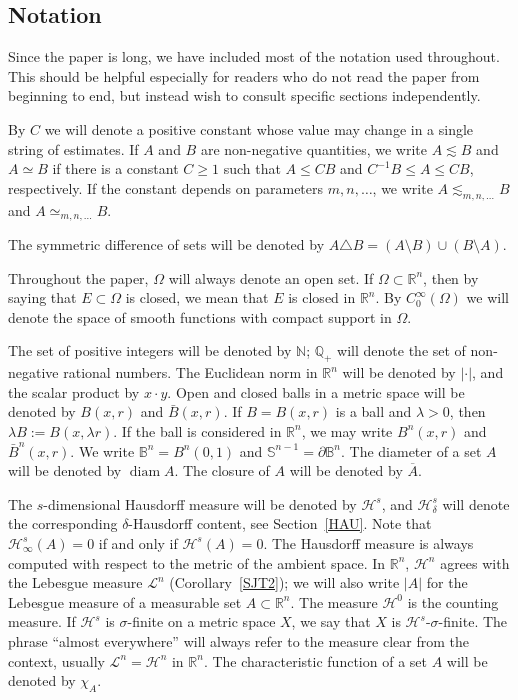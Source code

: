 \documentclass[12pt,leqno]{amsart}
\theoremstyle{definition}
\newcommand{\bbbr}{\mathbb R}
\newcommand{\bbbb}{\mathbb B}
\newcommand{\qp}{{\mathbb Q}_+}
\newcommand{\Sph}{\mathbb S}
\def\H{{\mathcal H}}
\def\LL{{\mathcal L}}
\numberwithin{theorem}{section} \numberwithin{equation}{section}
\begin{document}
\subsection*{Notation}
Since the paper is long, we have included most of the notation used throughout. This should be helpful especially for readers who do not read the paper from beginning to end, but instead wish to consult specific sections independently.

By $C$ we will denote a positive constant whose value may change in a single
string of estimates. If $A$ and $B$ are non-negative quantities, we write
$A \lesssim B$ and $A \simeq B$ if there is a constant $C \geq 1$ such that
$A \leq CB$ and $C^{-1}B \leq A \leq CB$, respectively. If the constant depends
on parameters $m,n,\ldots$, we write $A \lesssim_{m,n,\ldots} B$ and
$A \simeq_{m,n,\ldots} B$.

The symmetric difference of sets will be denoted by $A\triangle B=(A\setminus B)\cup (B\setminus A)$.

Throughout the paper, $\Omega$ will always denote an open set. If $\Omega\subset\bbbr^n$, then by saying that $E\subset\Omega$ is closed, we mean that $E$ is closed in $\bbbr^n$.
By $C_0^\infty(\Omega)$ we will denote the space of smooth functions with compact support in $\Omega$.

The set of positive integers will be denoted by $\mathbb N$; $\qp$ will denote the set of non-negative rational numbers. The Euclidean norm in
$\mathbb R^n$ will be denoted by $|\cdot|$, and the scalar product by
$x\cdot y$. Open and closed balls in a metric space will be denoted by
$B(x,r)$ and $\bar{B}(x,r)$. If $B=B(x,r)$ is a ball and $\lambda>0$,
then $\lambda B:=B(x,\lambda r)$.
If the ball is considered in $\mathbb R^n$,
we may write $B^n(x,r)$ and $\bar{B}^n(x,r)$. We write
$\bbbb^n=B^n(0,1)$ and $\Sph^{n-1}=\partial \bbbb^n$. The diameter of a set $A$ will be
denoted by $\operatorname{diam} A$.
The closure of $A$ will be denoted by $\overline{A}$.

The $s$-dimensional Hausdorff measure will be denoted by $\mathcal H^s$, and
$\mathcal H^s_\delta$ will denote the corresponding $\delta$-Hausdorff content, see Section~\ref{HAU}.
Note that $\H^s_\infty(A)=0$ if and only if $\H^s(A)=0$.
The Hausdorff measure is always computed with respect to the metric of the
ambient space. In $\mathbb R^n$, $\mathcal H^n$ agrees with the Lebesgue
measure $\LL^n$ (Corollary~\ref{SJT2}); we will also write $|A|$ for the Lebesgue measure of a measurable set
$A\subset \mathbb R^n$. The measure $\mathcal H^0$ is the counting measure.
If $\mathcal H^s$ is $\sigma$-finite on a metric space $X$, we say that $X$ is
$\mathcal H^s$-$\sigma$-finite. The phrase ``almost everywhere'' will always
refer to the measure clear from the context, usually $\LL^n=\H^n$ in
$\mathbb R^n$. The characteristic function of a set $A$ will be denoted by
$\chi_A$.
\end{document}
